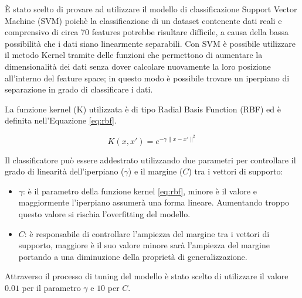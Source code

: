 È stato scelto di provare ad utilizzare il modello di classificazione 
Support Vector Machine (SVM) poichè la classificazione di un dataset contenente 
dati reali e comprensivo di circa 70 features potrebbe risultare difficile, a 
causa della bassa possibilità che i dati siano linearmente separabili. 
Con SVM è possibile utilizzare il metodo Kernel tramite delle funzioni 
che permettono di aumentare la dimensionalità dei dati senza dover 
calcolare nuovamente la loro posizione all'interno del feature space; in questo 
modo è possibile trovare un iperpiano di separazione in grado di classificare 
i dati.

La funzione kernel (K) utilizzata è di tipo 
Radial Basis Function (RBF) ed è definita nell'Equazione \ref{eq:rbf}.

\begin{equation}\label{eq:rbf}
    K(x, x') = e^{- \gamma \|x - x'\|^2}
\end{equation}

Il classificatore può essere addestrato utilizzando due parametri per 
controllare il grado di linearità dell'iperpiano ($\gamma$) e il margine ($C$) 
tra i vettori di supporto:

\begin{itemize}
    \item $\gamma$: è il parametro della funzione kernel \ref{eq:rbf}, minore è 
    il valore e maggiormente l'iperpiano assumerà una forma lineare. 
    Aumentando troppo questo valore si rischia l'overfitting del modello.
    \item $C$: è responsabile di controllare l'ampiezza del margine tra i 
    vettori di supporto, maggiore è il suo valore minore sarà l'ampiezza del 
    margine portando a una diminuzione della proprietà di generalizzazione.
\end{itemize}

Attraverso il processo di tuning del modello è stato scelto di utilizzare il 
valore $0.01$ per il parametro $\gamma$ e $10$ per $C$.
